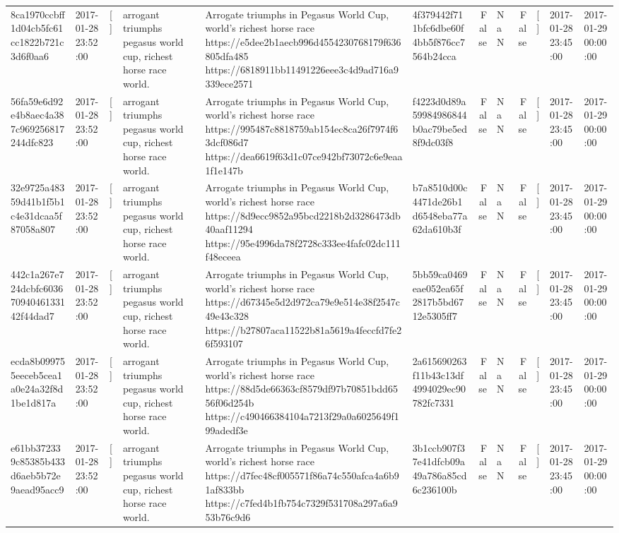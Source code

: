 \begin{tabular}{llllllrlrlll}
8ca1970ccbff1d04cb5fc61cc1822b721c3d6f0aa6 & 2017-01-28 23:52:00 & [] & arrogant triumphs pegasus world cup, richest horse race world. & Arrogate triumphs in Pegasus World Cup, world's richest horse race https://e5dee2b1aecb996d4554230768179f636805dfa485 https://6818911bb11491226eee3c4d9ad716a9339ece2571 & 4f379442f711bfc6dbe60f4bb5f876cc7564b24cca & False & NaN & False & [] & 2017-01-28 23:45:00 & 2017-01-29 00:00:00 \\
56fa59e6d92e4b8aec4a387c969256817244dfc823 & 2017-01-28 23:52:00 & [] & arrogant triumphs pegasus world cup, richest horse race world. & Arrogate triumphs in Pegasus World Cup, world's richest horse race https://995487c8818759ab154ec8ca26f7974f63dcf086d7 https://dea6619f63d1c07ce942bf73072c6e9eaa1f1e147b & f4223d0d89a59984986844b0ac79be5ed8f9dc03f8 & False & NaN & False & [] & 2017-01-28 23:45:00 & 2017-01-29 00:00:00 \\
32e9725a48359d41b1f5b1c4e31dcaa5f87058a807 & 2017-01-28 23:52:00 & [] & arrogant triumphs pegasus world cup, richest horse race world. & Arrogate triumphs in Pegasus World Cup, world's richest horse race https://8d9ecc9852a95bcd2218b2d3286473db40aaf11294 https://95e4996da78f2728c333ee4fafc02dc111f48eceea & b7a8510d00c4471de26b1d6548eba77a62da610b3f & False & NaN & False & [] & 2017-01-28 23:45:00 & 2017-01-29 00:00:00 \\
442c1a267e724dcbfc60367094046133142f44dad7 & 2017-01-28 23:52:00 & [] & arrogant triumphs pegasus world cup, richest horse race world. & Arrogate triumphs in Pegasus World Cup, world's richest horse race https://d67345e5d2d972ca79e9e514e38f2547c49e43c328 https://b27807aca11522b81a5619a4feccfd7fe26f593107 & 5bb59ca0469eae052ea65f2817b5bd6712e5305ff7 & False & NaN & False & [] & 2017-01-28 23:45:00 & 2017-01-29 00:00:00 \\
ecda8b099755eeceb5cea1a0e24a32f8d1be1d817a & 2017-01-28 23:52:00 & [] & arrogant triumphs pegasus world cup, richest horse race world. & Arrogate triumphs in Pegasus World Cup, world's richest horse race https://88d5de66363cf8579df97b70851bdd6556f06d254b https://c490466384104a7213f29a0a6025649f199adedf3e & 2a615690263f11b43c13df4994029ec90782fc7331 & False & NaN & False & [] & 2017-01-28 23:45:00 & 2017-01-29 00:00:00 \\
e61bb372339c85385b433d6aeb5b72e9aead95acc9 & 2017-01-28 23:52:00 & [] & arrogant triumphs pegasus world cup, richest horse race world. & Arrogate triumphs in Pegasus World Cup, world's richest horse race https://d7fec48cf005571f86a74c550afca4a6b91af833bb https://c7fed4b1fb754c7329f531708a297a6a953b76c9d6 & 3b1ccb907f37e41dfcb09a49a786a85cd6c236100b & False & NaN & False & [] & 2017-01-28 23:45:00 & 2017-01-29 00:00:00 \\

\end{tabular}
